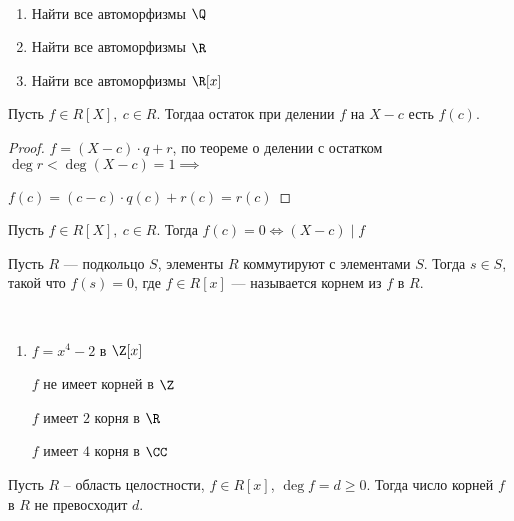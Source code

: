 \begin{exerc}~

    \begin{enumerate}
        \item Найти все автоморфизмы $\Q$
        
        \item Найти все автоморфизмы $\R$
        
        \item Найти все автоморфизмы $\R[x]$
    \end{enumerate}
\end{exerc}

\begin{theorem} [Безу]

    Пусть $f \in R[X],~c \in R$. Тогдаа остаток при делении $f$ на $X - c$ есть $f(c)$.    
\end{theorem}

\begin{proof}

    $f = (X - c) \cdot q + r$, по теореме о делении с остатком $\deg r < \deg (X - c) = 1 \implies$
    
    $f(c) = (c - c) \cdot q(c) + r(c) = r(c)$
\end{proof}

\begin{follow}
    
    Пусть $f \in R[X],~c \in R$. Тогда $f(c) = 0 \iff (X - c) \mid f$
\end{follow}

\begin{defn}
    Пусть $R$ --- подкольцо $S$, элементы $R$ коммутируют с элементами $S$. Тогда $s \in S$, такой что $f(s) = 0$, где $f \in R[x]$ --- называется корнем из $f$ в $R$.
\end{defn}

\begin{examples}~

    \begin{enumerate}
        \item $f = x^4 - 2$ в $\Z[x]$
        
        $f$ не имеет корней в $\Z$

        $f$ имеет $2$ корня в $\R$

        $f$ имеет $4$ корня в $\CC$
    \end{enumerate}
\end{examples}

\begin{theorem-non}
    Пусть $R$ -- область целостности, $f \in R[x]$, $\deg f = d \geq 0$. Тогда число корней $f$ в $R$ не превосходит $d$.
\end{theorem-non}

